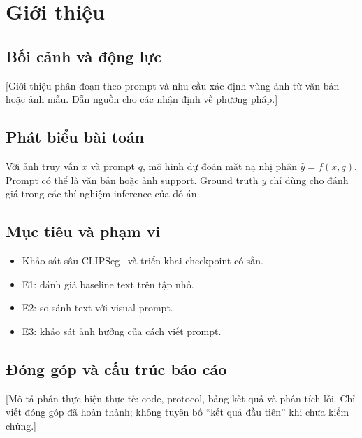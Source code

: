\chapter{Giới thiệu}
\section{Bối cảnh và động lực}
[Giới thiệu phân đoạn theo prompt và nhu cầu xác định vùng ảnh từ văn bản hoặc ảnh mẫu. Dẫn nguồn cho các nhận định về phương pháp.]

\section{Phát biểu bài toán}
Với ảnh truy vấn $x$ và prompt $q$, mô hình dự đoán mặt nạ nhị phân $\hat{y}=f(x,q)$. Prompt có thể là văn bản hoặc ảnh support. Ground truth $y$ chỉ dùng cho đánh giá trong các thí nghiệm inference của đồ án.

\section{Mục tiêu và phạm vi}
\begin{itemize}
\item Khảo sát sâu CLIPSeg~\cite{luddecke2022clipseg} và triển khai checkpoint có sẵn.
\item E1: đánh giá baseline text trên tập nhỏ.
\item E2: so sánh text với visual prompt.
\item E3: khảo sát ảnh hưởng của cách viết prompt.
\end{itemize}

\section{Đóng góp và cấu trúc báo cáo}
[Mô tả phần thực hiện thực tế: code, protocol, bảng kết quả và phân tích lỗi. Chỉ viết đóng góp đã hoàn thành; không tuyên bố ``kết quả đầu tiên'' khi chưa kiểm chứng.]
